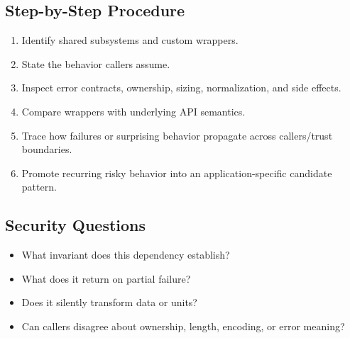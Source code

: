 \documentclass[10pt]{article}
\begin{document}
\subsection*{Step-by-Step Procedure}
\begin{enumerate}
\item Identify shared subsystems and custom wrappers.
\item State the behavior callers assume.
\item Inspect error contracts, ownership, sizing, normalization, and side effects.
\item Compare wrappers with underlying API semantics.
\item Trace how failures or surprising behavior propagate across callers/trust boundaries.
\item Promote recurring risky behavior into an application-specific candidate pattern.
\end{enumerate}
\subsection*{Security Questions}
\begin{itemize}
\item What invariant does this dependency establish?
\item What does it return on partial failure?
\item Does it silently transform data or units?
\item Can callers disagree about ownership, length, encoding, or error meaning?
\end{itemize}

\end{document}
